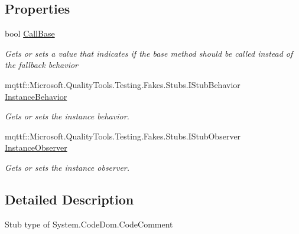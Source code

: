 \subsection*{Properties}
\begin{DoxyCompactItemize}
\item 
bool \hyperlink{class_system_1_1_code_dom_1_1_fakes_1_1_stub_code_comment_a834583877497c3e67a8919d7bd224f66}{Call\-Base}
\begin{DoxyCompactList}\small\item\em Gets or sets a value that indicates if the base method should be called instead of the fallback behavior\end{DoxyCompactList}\item 
mqttf\-::\-Microsoft.\-Quality\-Tools.\-Testing.\-Fakes.\-Stubs.\-I\-Stub\-Behavior \hyperlink{class_system_1_1_code_dom_1_1_fakes_1_1_stub_code_comment_a4cd80c20634875e0d599ec64d953a722}{Instance\-Behavior}
\begin{DoxyCompactList}\small\item\em Gets or sets the instance behavior.\end{DoxyCompactList}\item 
mqttf\-::\-Microsoft.\-Quality\-Tools.\-Testing.\-Fakes.\-Stubs.\-I\-Stub\-Observer \hyperlink{class_system_1_1_code_dom_1_1_fakes_1_1_stub_code_comment_a91c594023e3590ab2ef5c154aa3605ed}{Instance\-Observer}
\begin{DoxyCompactList}\small\item\em Gets or sets the instance observer.\end{DoxyCompactList}\end{DoxyCompactItemize}


\subsection{Detailed Description}
Stub type of System.\-Code\-Dom.\-Code\-Comment



